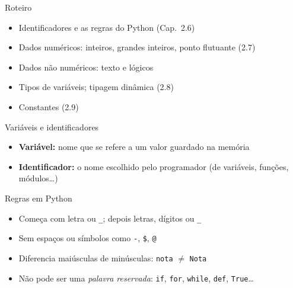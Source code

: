 \documentclass[aspectratio=169,10pt,t]{beamer}
\begin{document}
\capa

\begin{frame}{Roteiro}
  \begin{itemize}
    \item Identificadores e as regras do Python (Cap.~2.6)
    \item Dados numéricos: inteiros, grandes inteiros, ponto flutuante (2.7)
    \item Dados não numéricos: texto e lógicos
    \item Tipos de variáveis; tipagem dinâmica (2.8)
    \item Constantes (2.9)
  \end{itemize}
\end{frame}

\begin{frame}{Variáveis e identificadores}
  \begin{itemize}
    \item \textbf{Variável:} nome que se refere a um valor guardado na memória
    \item \textbf{Identificador:} o nome escolhido pelo programador (de variáveis, funções, módulos\ldots)
  \end{itemize}
  \begin{block}{Regras em Python}
    \begin{itemize}\small
      \item Começa com letra ou \texttt{\_}; depois letras, dígitos ou \texttt{\_}
      \item Sem espaços ou símbolos como \texttt{-}, \texttt{\$}, \texttt{@}
      \item Diferencia maiúsculas de minúsculas: \texttt{nota} \(\neq\) \texttt{Nota}
      \item Não pode ser uma \emph{palavra reservada}: \texttt{if}, \texttt{for}, \texttt{while}, \texttt{def}, \texttt{True}\ldots
    \end{itemize}
  \end{block}
\end{frame}
\end{document}
